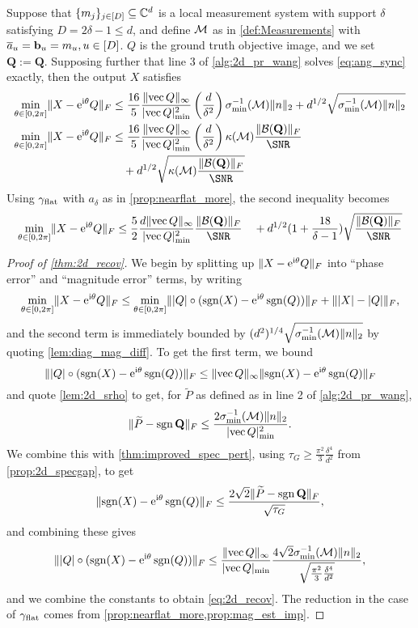 \begin{theorem}
  Suppose that $\{m_j\}_{j \in [D]} \subseteq \mathbb{C}^d$ is a local measurement system with support $\delta$ satisfying $D = 2 \delta - 1 \le d$, and define $\mathcal{M}$ as in \eqref{def:Measurements} with $\overline{a}_u = \mathbf b_u = m_u, u \in [D]$.  $Q$ is the ground truth objective image, and we set $\mathbf{Q} := \mathbf{Q}$.  Supposing further that line 3 of \cref{alg:2d_pr_wang} solves \eqref{eq:ang_sync} exactly, then the output $X$ satisfies
  \begin{equation}
    \begin{aligned}
      \mintheta \norm{X - \eit Q}_F &\le \frac{16}{5} \dfrac{\norm{\vec Q}_\infty}{\abs{\vec Q}_{\min}^2} \left(\dfrac{d}{\delta^2}\right) \sigma_{\min}^{-1}(\Mc) \norm{n}_2 + d^{1/2} \sqrt{\sigma_{\min}^{-1}(\Mc) \norm{n}_2} \\
      \mintheta \norm{X - \eit Q}_F &\le \frac{16}{5} \dfrac{\norm{\vec Q}_\infty}{\abs{\vec Q}_{\min}^2} \left(\dfrac{d}{\delta^2}\right) \kappa(\Mc) \frac{\norm{\B(\mathbf{Q})}_F}{\SNR} \\ &\quad + d^{1/2} \sqrt{\kappa(\Mc) \frac{\norm{\B(\mathbf{Q})}_F}{\SNR}} \\
    \end{aligned}
    \label{eq:2d_recov}
  \end{equation}
  Using $\gamma_{\rm flat}$ with $a_\delta$ as in \cref{prop:nearflat_more}, the second inequality becomes
  \[\mintheta \norm{X - \eit Q}_F \le \frac{5}{2} \dfrac{d \norm{\vec Q}_\infty}{\abs{\vec Q}_{\min}^2} \frac{\norm{\B(\mathbf{Q})}_F}{\SNR} \quad + d^{1/2} (1 + \frac{18}{\delta - 1}) \sqrt{\frac{\norm{\B(\mathbf{Q})}_F}{\SNR}}\]
  \label{thm:2d_recov}
\end{theorem}

\begin{proof}[Proof of \cref{thm:2d_recov}]
  We begin by splitting up $\lVert X - \mathrm{e}^{\mathrm{i} \theta} Q\rVert_F$ into ``phase error'' and ``magnitude error'' terms, by writing \[\min_{\theta \in [0, 2\pi]} \lVert X - \mathrm{e}^{\mathrm{i} \theta} Q\rVert_F \le \min_{\theta \in [0, 2\pi]} \lVert\lvert Q\rvert \circ (\operatorname{sgn}(X) - \mathrm{e}^{\mathrm{i} \theta} \operatorname{sgn}(Q))\rVert_F + \lVert\lvert X\rvert - \lvert Q\rvert\rVert_F,\] and the second term is immediately bounded by $(d^2)^{1/4} \sqrt{\sigma_{\min}^{-1}(\mathcal{M}) \lVert n\rVert_2}$ by quoting \cref{lem:diag_mag_diff}.  To get the first term, we bound \[\lVert\lvert Q\rvert \circ (\operatorname{sgn}(X) - \mathrm{e}^{\mathrm{i} \theta} \operatorname{sgn}(Q))\rVert_F \le \lVert\operatorname{vec} Q\rVert_\infty \lVert\operatorname{sgn}(X) - \mathrm{e}^{\mathrm{i} \theta} \operatorname{sgn}(Q)\rVert_F\] and quote \cref{lem:2d_srho} to get, for $\widetilde{P}$ as defined as in line 2 of \cref{alg:2d_pr_wang}, \[\lVert\widetilde{P} - \operatorname{sgn}{\mathbf{Q}}\rVert_F \le \frac{2 \sigma_{\min}^{-1}(\mathcal{M}) \lVert n\rVert_2}{\lvert\operatorname{vec} Q\rvert_{\min}^2}.\]  We combine this with \cref{thm:improved_spec_pert}, using $\tau_G \ge \frac{\pi^2}{3}\frac{\delta^4}{d^2}$ from \cref{prop:2d_specgap}, to get \[\lVert\operatorname{sgn}(X) - \mathrm{e}^{\mathrm{i} \theta} \operatorname{sgn}(Q)\rVert_F \le \dfrac{2 \sqrt{2} \lVert\widetilde{P} - \operatorname{sgn}{\mathbf{Q}}\rVert_F}{\sqrt{\tau_G}},\] and combining these gives \[\lVert\lvert Q\rvert \circ (\operatorname{sgn}(X) - \mathrm{e}^{\mathrm{i} \theta} \operatorname{sgn}(Q))\rVert_F \le \dfrac{\lVert\operatorname{vec} Q\rVert_\infty}{\lvert\operatorname{vec} Q\rvert_{\min}} \dfrac{4 \sqrt{2} \sigma_{\min}^{-1}(\mathcal{M}) \lVert n\rVert_2}{\sqrt{\frac{\pi^2}{3} \frac{\delta^4}{d^2}}},\] and we combine the constants to obtain \eqref{eq:2d_recov}.  The reduction in the case of $\gamma_{\rm flat}$ comes from \cref{prop:nearflat_more,prop:mag_est_imp}.
\end{proof}
